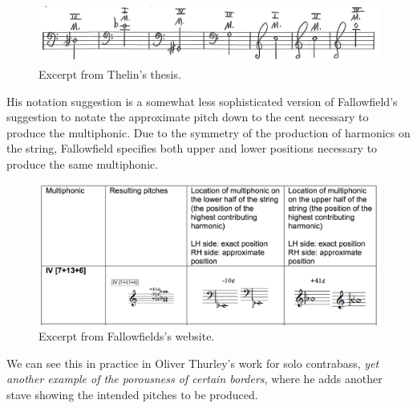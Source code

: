 \begin{figure}
    \includegraphics[width=\linewidth]{./resources/thelinMultiphonicNotation.png}
    \caption{Excerpt from Thelin's thesis.}
  \label{fig:Excerpt from Thelin's thesis}
  \end{figure}
His notation suggestion is a somewhat less sophisticated version of Fallowfield's suggestion to notate the approximate pitch down to the cent necessary to produce the multiphonic. Due to the symmetry of the production of harmonics on the string, Fallowfield specifies both upper and lower positions necessary to produce the same multiphonic.\autocite[index/the-string/multiphonics-and-other-multiple-sounds/fingeringcharts.html]{fallowfieldCelloMap}
\begin{figure}
    \includegraphics[width=\linewidth]{./resources/fallowfieldMultiphonicFingering.png}
    \caption{Excerpt from Fallowfields's website.}
\label{fig:Excerpt from Fallowfields's website}
  \end{figure}

  We can see this in practice in Oliver Thurley's work for solo contrabass, \emph{yet another example of the porousness of certain borders}, where he adds another stave showing the intended pitches to be produced.\autocite{thurleyAnotherExamplePorousness2014}

